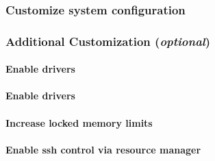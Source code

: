 \documentclass[letterpaper]{article}
\begin{document}
\subsubsection{Customize system configuration} \label{sec:master_customization}





\subsubsection{Additional Customization ({\em optional})} \label{sec:addl_customizations}


\paragraph{Enable \InfiniBand{} drivers}


\paragraph{Enable \OmniPath{} drivers}


\vspace*{0.28cm}
\paragraph{Increase locked memory limits}


\vspace*{-.17cm}
\paragraph{Enable ssh control via resource manager}


%
\end{document}
